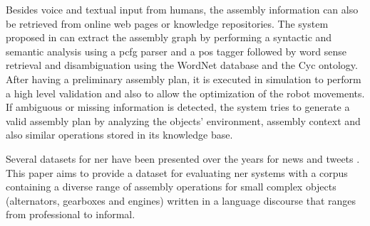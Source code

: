 Besides voice and textual input from humans, the assembly information can also be retrieved from online web pages or knowledge repositories. The system proposed in \cite{Tenorth2010} can extract the assembly graph by performing a syntactic and semantic analysis using a \gls{pcfg} parser and a \gls{pos} tagger followed by word sense retrieval and disambiguation using the WordNet database and the Cyc ontology. After having a preliminary assembly plan, it is executed in simulation to perform a high level validation and also to allow the optimization of the robot movements. If ambiguous or missing information is detected, the system tries to generate a valid assembly plan by analyzing the objects' environment, assembly context and also similar operations stored in its knowledge base.

Several datasets for \gls{ner} have been presented over the years for news and tweets \cite{Dojchinovski2013,Roder2014}. This paper aims to provide a dataset for evaluating \gls{ner} systems with a corpus containing a diverse range of assembly operations for small complex objects (alternators, gearboxes and engines) written in a language discourse that ranges from professional to informal.
